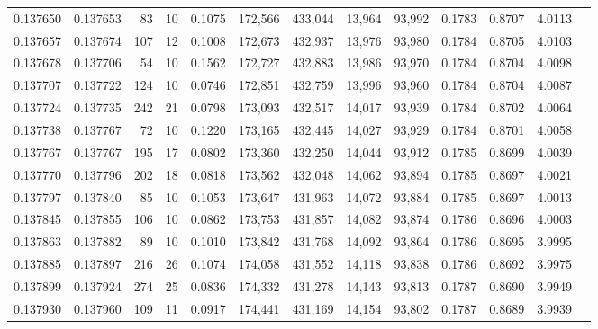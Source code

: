 \begin{tabular}{rrrrrrrrrrrrr}
0.137650 & 0.137653 &    83 &  10 &                                     0.1075 & 172,566 & 433,044 &  13,964 &  93,992 & 0.1783 & 0.8707 & 4.0113 \\
0.137657 & 0.137674 &   107 &  12 &                                     0.1008 & 172,673 & 432,937 &  13,976 &  93,980 & 0.1784 & 0.8705 & 4.0103 \\
0.137678 & 0.137706 &    54 &  10 &                                     0.1562 & 172,727 & 432,883 &  13,986 &  93,970 & 0.1784 & 0.8704 & 4.0098 \\
0.137707 & 0.137722 &   124 &  10 &                                     0.0746 & 172,851 & 432,759 &  13,996 &  93,960 & 0.1784 & 0.8704 & 4.0087 \\
0.137724 & 0.137735 &   242 &  21 &                                     0.0798 & 173,093 & 432,517 &  14,017 &  93,939 & 0.1784 & 0.8702 & 4.0064 \\
0.137738 & 0.137767 &    72 &  10 &                                     0.1220 & 173,165 & 432,445 &  14,027 &  93,929 & 0.1784 & 0.8701 & 4.0058 \\
0.137767 & 0.137767 &   195 &  17 &                                     0.0802 & 173,360 & 432,250 &  14,044 &  93,912 & 0.1785 & 0.8699 & 4.0039 \\
0.137770 & 0.137796 &   202 &  18 &                                     0.0818 & 173,562 & 432,048 &  14,062 &  93,894 & 0.1785 & 0.8697 & 4.0021 \\
0.137797 & 0.137840 &    85 &  10 &                                     0.1053 & 173,647 & 431,963 &  14,072 &  93,884 & 0.1785 & 0.8697 & 4.0013 \\
0.137845 & 0.137855 &   106 &  10 &                                     0.0862 & 173,753 & 431,857 &  14,082 &  93,874 & 0.1786 & 0.8696 & 4.0003 \\
0.137863 & 0.137882 &    89 &  10 &                                     0.1010 & 173,842 & 431,768 &  14,092 &  93,864 & 0.1786 & 0.8695 & 3.9995 \\
0.137885 & 0.137897 &   216 &  26 &                                     0.1074 & 174,058 & 431,552 &  14,118 &  93,838 & 0.1786 & 0.8692 & 3.9975 \\
0.137899 & 0.137924 &   274 &  25 &                                     0.0836 & 174,332 & 431,278 &  14,143 &  93,813 & 0.1787 & 0.8690 & 3.9949 \\
0.137930 & 0.137960 &   109 &  11 &                                     0.0917 & 174,441 & 431,169 &  14,154 &  93,802 & 0.1787 & 0.8689 & 3.9939 \\

\end{tabular}
